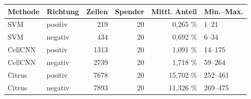 \begin{tabular}{llrrrl}
\toprule
Methode & Richtung & Zellen & Spender & Mittl. Anteil & Min.–Max. \\
\midrule
SVM & positiv & 219 & 20 & 0,265 \% & 1–21 \\
SVM & negativ & 434 & 20 & 0,692 \% & 6–34 \\
CellCNN & positiv & 1313 & 20 & 1,091 \% & 14–175 \\
CellCNN & negativ & 2739 & 20 & 1,718 \% & 59–264 \\
Citrus & positiv & 7678 & 20 & 15,702 \% & 252–461 \\
Citrus & negativ & 7893 & 20 & 11,326 \% & 269–475 \\
\bottomrule
\end{tabular}
